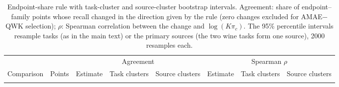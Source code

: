 \documentclass[10pt]{article}
\begin{document}
{\footnotesize
\begin{longtable}{@{}lrrllrll@{}}
\caption{Endpoint-share rule with task-cluster and source-cluster bootstrap intervals. Agreement: share of endpoint--family points whose recall changed in the direction given by the rule (zero changes excluded for AMAE$-$QWK selection); $\rho$: Spearman correlation between the change and $\log(K\pi_c)$. The 95\% percentile intervals resample tasks (as in the main text) or the \NSourcesRule{} primary sources (the two wine tasks form one source), 2000 resamples each.}\label{tab:s-source-rule}\\
\toprule
& & \multicolumn{3}{c}{Agreement} & \multicolumn{3}{c}{Spearman $\rho$}\\
Comparison & Points & Estimate & Task clusters & Source clusters & Estimate & Task clusters & Source clusters\\
\midrule\endfirsthead
\bottomrule\endfoot

\end{longtable}
}
\end{document}
